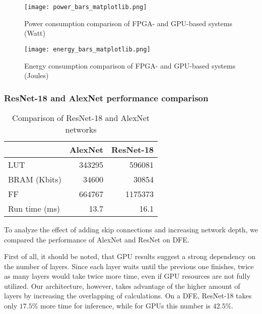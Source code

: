 \documentclass[conference]{IEEEtran}
\newcommand{\ra}[1]{\renewcommand{\arraystretch}{#1}}
\begin{document}
	\begin{figure}
		\centering
		
		\texttt{[image: power\_bars\_matplotlib.png]}
		\vspace{-2em}
		\caption{Power consumption comparison of FPGA- and GPU-based systems (Watt)}
		\label{power_bars}
		\vspace{-1.2em}
	\end{figure}
	
	
	\begin{figure}
		\centering
		
		\texttt{[image: energy\_bars\_matplotlib.png]}
		\vspace{-2em}
		\caption{Energy consumption comparison of FPGA- and GPU-based systems (Joules)}
		\label{energy_bars}
		\vspace{-1em}
	\end{figure}
	\subsubsection{ResNet-18 and AlexNet performance comparison}
	
	\begin{table}
		\centering
		\ra{1.3}
		
		\begin{adjustbox}{width=0.55\linewidth}
			\begin{tabular}{@{}lrr@{}} \toprule
				&AlexNet&ResNet-18\\ \midrule
				LUT&343295&596081\\
				BRAM (Kbits)&34600&30854\\
				FF&664767&1175373\\
				Run time (ms)&13.7&16.1\\
				\bottomrule
			\end{tabular}
		\end{adjustbox}
		\vspace{-.5em}
		\caption{Comparison of ResNet-18 and AlexNet networks}
		\label{AN_RN_compare}
		\vspace{-.7em}
	\end{table}
	
	To analyze the effect of adding skip connections and increasing network depth, we compared the performance of AlexNet and ResNet on DFE.
	
	First of all, it should be noted, that GPU results suggest a strong dependency on the number of layers. Since each layer waits until the previous one finishes, twice as many layers would take twice more time, even if GPU resources are not fully utilized. Our architecture, however, takes advantage of the higher amount of layers by increasing the overlapping of calculations. On a DFE, ResNet-18 takes only $17.5\%$ more time for inference, while for GPUs this number is $42.5\%$.
	
\end{document}
